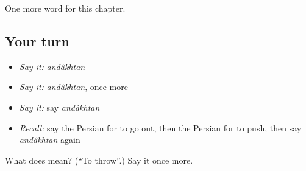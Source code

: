 \begin{grammarlens}[title={What you've built}]
One more word for this chapter.
\end{grammarlens}

\subsection*{Your turn}
\begin{itemize}
\raggedright
  \item \emph{Say it:} \emph{andâkhtan}
  \item \emph{Say it:} \emph{andâkhtan}, once more
  \item \emph{Say it:} say \emph{andâkhtan}
  \item \emph{Recall:} say the Persian for to go out, then the Persian for to push, then say \emph{andâkhtan} again
\end{itemize}

\begin{tcolorbox}[breakable,colback=teal!4,colframe=teal!35!black,title={Before you move on}]
What does  mean? (\textquotedblleft{}To throw\textquotedblright{}.) Say it once more.
\end{tcolorbox}
